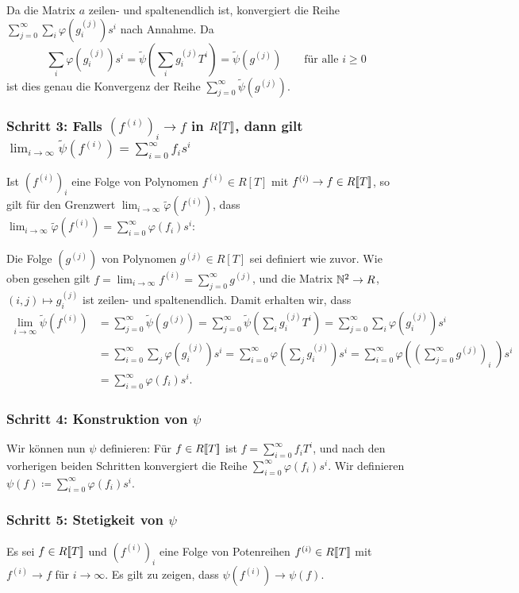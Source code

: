 \documentclass[a4paper, 10pt, numbers=noenddot]{scrartcl}
\begin{document}
Da die Matrix $a$ zeilen- und spaltenendlich ist, konvergiert die Reihe $\sum_{j=0}^\infty \sum_i \varphi( g^{(j)}_i ) s^i$ nach Annahme.
Da
\[
    \sum_i \varphi\left( g^{(j)}_i \right) s^i
  = \tilde{\psi}\left( \sum_i g^{(j)}_i T^i \right)
  = \tilde{\psi}\left( g^{(j)} \right)
  \qquad
  \text{für alle $i \geq 0$}
\]
ist dies genau die Konvergenz der Reihe $\sum_{j=0}^\infty \tilde{\psi}(g^{(j)})$.


\subsubsection*{Schritt 3: Falls $(f^{(i)})_i \to f$ in $R[\![T]\!]$, dann gilt $\lim_{i \to \infty} \tilde{\psi}(f^{(i)}) = \sum_{i=0}^\infty f_i s^i$}
Ist $(f^{(i)})_i$ eine Folge von Polynomen $f^{(i)} \in R[T]$ mit $f^{(i)} \to f \in R[\![T]\!]$, so gilt für den Grenzwert $\lim_{i \to \infty} \tilde{\varphi}(f^{(i)})$, dass $\lim_{i \to \infty} \tilde{\varphi}(f^{(i)}) = \sum_{i=0}^\infty \varphi(f_i) s^i$:

Die Folge $(g^{(j)})$ von Polynomen $g^{(j)} \in R[T]$ sei definiert wie zuvor.
Wie oben gesehen gilt $f = \lim_{i \to \infty} f^{(i)} = \sum_{j=0}^\infty g^{(j)}$, und die Matrix $\mathbb{N}^2 \to R$, $(i,j) \mapsto g^{(j)}_i$ ist zeilen- und spaltenendlich.
Damit erhalten wir, dass
\begin{align*}
    \lim_{i \to \infty} \tilde{\psi}\left( f^{(i)} \right)
  &= \sum_{j=0}^\infty \tilde{\psi}\left( g^{(j)} \right)
   = \sum_{j=0}^\infty \tilde{\psi}\left( \sum_i g^{(j)}_i T^i \right)
   = \sum_{j=0}^\infty \sum_i \varphi\left( g^{(j)}_i \right) s^i
  \\
  &= \sum_{i=0}^\infty \sum_j \varphi\left( g^{(j)}_i \right) s^i
   = \sum_{i=0}^\infty \varphi\left( \sum_j g^{(j)}_i \right) s^i
   = \sum_{i=0}^\infty \varphi\left( \left( \sum_{j=0}^\infty g^{(j)} \right)_{\!\!\!i}\; \right) s^i
  \\
  &= \sum_{i=0}^\infty \varphi(f_i) s^i.
\end{align*}


\subsubsection*{Schritt 4: Konstruktion von $\psi$}
Wir können nun $\psi$ definieren:
Für $f \in R[\![T]\!]$ ist $f = \sum_{i=0}^\infty f_i T^i$, und nach den vorherigen beiden Schritten konvergiert die Reihe $\sum_{i=0}^\infty \varphi(f_i) s^i$.
Wir definieren $\psi(f) \coloneqq \sum_{i=0}^\infty \varphi(f_i) s^i$.


\subsubsection*{Schritt 5: Stetigkeit von $\psi$}
Es sei $f \in R[\![T]\!]$ und $(f^{(i)})_i$ eine Folge von Potenreihen $f^{(i)} \in R[\![T]\!]$ mit $f^{(i)} \to f$ für $i \to \infty$.
Es gilt zu zeigen, dass $\psi(f^{(i)}) \to \psi(f)$.
\end{document}
